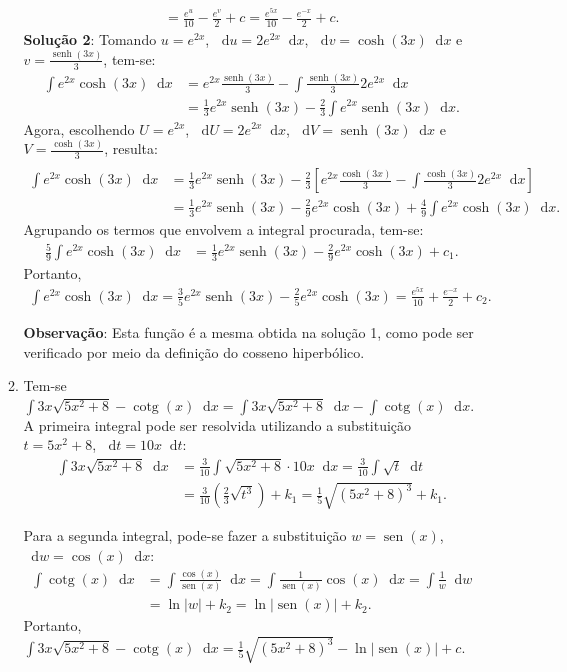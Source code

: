 \documentclass[12pt,a4paper]{article}
\newcommand*\diff{\mathop{}\!\mathrm{d}}
\newcommand*\sen{\operatorname{sen}}
\newcommand*\senh{\operatorname{senh}}
\newcommand*\cotg{\operatorname{cotg}}
\begin{document}
\begin{enumerate}
\begin{enumerate}
\begin{align*}
  = \frac{e^u}{10} - \frac{e^v}{2}  + c
  = \frac{e^{5x}}{10} - \frac{e^{-x}}{2} + c.
\end{align*}
\textbf{Solução 2}: Tomando
$u=e^{2x}$,
$\diff u=2 e^{2x} \diff x$,
$\diff v=\cosh(3x)\diff x$ e
$v=\frac{\senh(3x)}{3}$, tem-se:
\begin{align*}
\int e^{2x} \cosh(3x) \diff x
& = e^{2x} \frac{\senh(3x)}{3} - \int \frac{\senh(3x)}{3} 2 e^{2x} \diff x\\
& = \frac{1}{3}e^{2x}\senh(3x) - \frac{2}{3}\int e^{2x} \senh(3x) \diff x.
\end{align*}
Agora, escolhendo
$U=e^{2x}$,
$\diff U=2 e^{2x} \diff x$,
$\diff V=\senh(3x)\diff x$ e
$V=\frac{\cosh(3x)}{3}$, resulta:
\begin{align*}
\\
\int e^{2x} \cosh(3x) \diff x
& = \frac{1}{3}e^{2x}\senh(3x) - \frac{2}{3}\left[
e^{2x}\frac{\cosh(3x)}{3}
-
\int \frac{\cosh(3x)}{3} 2 e^{2x} \diff x
\right]\\
& = \frac{1}{3}e^{2x}\senh(3x)
- \frac{2}{9} e^{2x}\cosh(3x)
+ \frac{4}{9} \int e^{2x} \cosh(3x) \diff x.
\end{align*}
Agrupando os termos que envolvem a integral procurada, tem-se:
\begin{align*}
\frac{5}{9} \int e^{2x} \cosh(3x) \diff x
& = \frac{1}{3}e^{2x}\senh(3x) - \frac{2}{9} e^{2x}\cosh(3x) + c_1.
\end{align*}
Portanto,
\begin{align*}
\int e^{2x} \cosh(3x) \diff x
= \frac{3}{5} e^{2x}\senh(3x) - \frac{2}{5} e^{2x}\cosh(3x)
= \frac{e^{5x}}{10} + \frac{e^{-x}}{2} + c_2.
\end{align*}

\textbf{Observação}: Esta função é a mesma obtida na solução 1, como pode ser verificado por meio da definição do cosseno hiperbólico.

\item Tem-se $
\int 3x \sqrt{5x^2+8} -\cotg(x) \diff x
= \int 3x \sqrt{5x^2+8} \diff x
 -\int \cotg(x) \diff x
$. A primeira integral pode ser resolvida utilizando a substituição $t = 5x^2+8$, $\diff t = 10x \diff t$:
\begin{align*}
\int 3x \sqrt{5x^2+8} \diff x
& = \frac{3}{10} \int \sqrt{5x^2+8} \cdot 10x \diff x
= \frac{3}{10} \int \sqrt{t} \diff t\\
&= \frac{3}{10} \left( \frac{2}{3}\sqrt{t^3}\right) + k_1
= \frac{1}{5}\sqrt{(5x^2+8)^3} + k_1.
\end{align*}

Para a segunda integral, pode-se fazer a substituição $w = \sen(x)$, $\diff w = \cos(x) \diff x$:
\begin{align*}
\int \cotg(x) \diff x
&= \int \frac{\cos(x)}{\sen(x)} \diff x
= \int \frac{1}{\sen(x)} \cos(x)\diff x
= \int \frac{1}{w} \diff w\\
&= \ln|w| + k_2
= \ln|\sen(x)| + k_2.
\end{align*}
Portanto, $\int 3x \sqrt{5x^2+8} -\cotg(x) \diff x = \frac{1}{5}\sqrt{(5x^2+8)^3} - \ln|\sen(x)| + c$.


\end{enumerate}
\end{enumerate}
\end{document}
